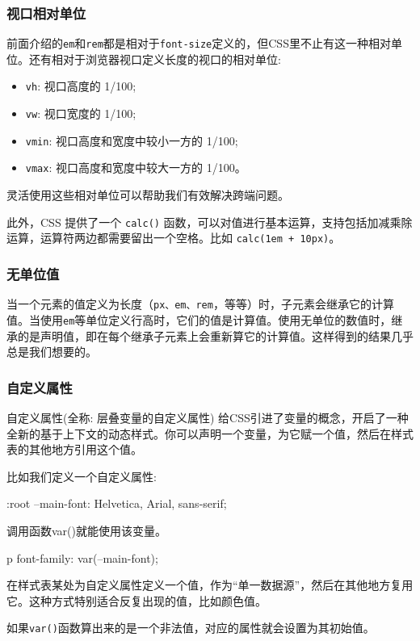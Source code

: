 \subsubsection*{视口相对单位}

前面介绍的\texttt{em}和\texttt{rem}都是相对于\texttt{font-size}定义的，但CSS里不止有这一种相对单位。还有相对于浏览器视口定义长度的视口的相对单位:
\begin{itemize}
    \item \texttt{vh}: 视口高度的 1/100;
    \item \texttt{vw}: 视口宽度的 1/100;
    \item \texttt{vmin}: 视口高度和宽度中较小一方的 1/100;
    \item \texttt{vmax}: 视口高度和宽度中较大一方的 1/100。
\end{itemize}

灵活使用这些相对单位可以帮助我们有效解决跨端问题。

此外，CSS 提供了一个 \texttt{calc()} 函数，可以对值进行基本运算，支持包括加减乘除运算，运算符两边都需要留出一个空格。比如 \texttt{calc(1em + 10px)}。

\subsubsection*{无单位值}

当一个元素的值定义为长度（\texttt{px、em、rem}，等等）时，子元素会继承它的计算值。当使用\texttt{em}等单位定义行高时，它们的值是计算值。使用无单位的数值时，继承的是声明值，即在每个继承子元素上会重新算它的计算值。这样得到的结果几乎总是我们想要的。

\subsubsection*{自定义属性}

自定义属性(全称: 层叠变量的自定义属性) 给CSS引进了变量的概念，开启了一种全新的基于上下文的动态样式。你可以声明一个变量，为它赋一个值，然后在样式表的其他地方引用这个值。

比如我们定义一个自定义属性:

\begin{HTML}
:root {  
    --main-font: Helvetica, Arial, sans-serif;
} 
\end{HTML}

调用函数var()就能使用该变量。

\begin{HTML}
p {  
    font-family: var(--main-font);
} 
\end{HTML}

在样式表某处为自定义属性定义一个值，作为“单一数据源”，然后在其他地方复用它。这种方式特别适合反复出现的值，比如颜色值。

如果\texttt{var()}函数算出来的是一个非法值，对应的属性就会设置为其初始值。

\newpage